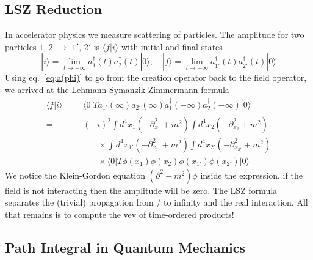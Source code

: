 \documentclass[12pt]{article}
\begin{document}
\subsection{LSZ Reduction}

In accelerator physics we measure scattering of particles. The
amplitude for two particles $1$, $2$ $\rightarrow$ $1'$, $2'$ is
$\langle f|i\rangle$ with initial and final states
\begin{equation}
  |i\rangle = \lim_{t\to-\infty} a_1^\dagger(t) a_2^\dagger(t) |0\rangle
  ,\quad
  |f\rangle = \lim_{t\to+\infty} a_{1'}^\dagger(t) a_{2'}^\dagger(t) |0\rangle
\end{equation}
Using eq.~\eqref{eq:a(phi)} to go from the creation operator back to
the field operator, we arrived at the Lehmann-Symanzik-Zimmermann
formula
\begin{equation}
  \begin{split}
    \langle f|i\rangle =&\; 
    \langle 0| T a_{1'}(\infty) a_{2'}(\infty) 
    a_1^\dagger(-\infty) a_2^\dagger(-\infty) |0\rangle
    \\ =&\;
    (-i)^2 
    \int d^4x_1 (-\partial_{x_1}^2+m^2)
    \int d^4x_2 (-\partial_{x_2}^2+m^2)
    \\ & \qquad \times
    \int d^4x_{1'} (-\partial_{x_{1'}}^2+m^2)
    \int d^4x_{2'} (-\partial_{x_{2'}}^2+m^2)
    \\ & \qquad \times
    \langle 0| T \phi(x_1) \phi(x_2) 
    \phi(x_{1'}) \phi(x_{2'}) |0\rangle    
  \end{split}
\end{equation}
We notice the Klein-Gordon equation $(\partial^2-m^2)\phi$ inside the
expression, if the field is not interacting then the amplitude will be
zero. The LSZ formula separates the (trivial) propagation from / to
infinity and the real interaction. All that remains is to compute the
vev of time-ordered products!


\subsection{Path Integral in Quantum Mechanics}
\end{document}
